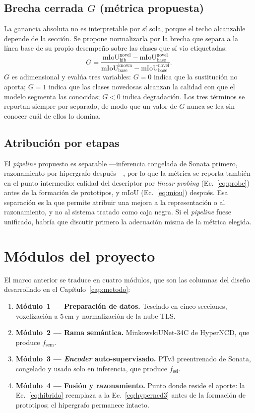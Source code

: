 \subsection{Brecha cerrada $G$ (métrica propuesta)}

La ganancia absoluta no es interpretable por sí sola, porque el techo alcanzable
depende de la sección. Se propone normalizarla por la brecha que separa a la
línea base de su propio desempeño sobre las clases que sí vio etiquetadas:
\begin{equation}
G=\frac{\mathrm{mIoU}^{\mathrm{novel}}_{\mathrm{hib}}-\mathrm{mIoU}^{\mathrm{novel}}_{\mathrm{base}}}
{\mathrm{mIoU}^{\mathrm{known}}_{\mathrm{base}}-\mathrm{mIoU}^{\mathrm{novel}}_{\mathrm{base}}}.
\label{eq:G}
\end{equation}
$G$ es adimensional y evalúa tres variables: $G=0$ indica que la sustitución no
aporta; $G=1$ indica que las clases novedosas alcanzan la calidad con que el
modelo segmenta las conocidas; $G<0$ indica degradación. Los tres términos se
reportan siempre por separado, de modo que un valor de $G$ nunca se lea sin
conocer cuál de ellos lo domina.

\subsection{Atribución por etapas}

El \emph{pipeline} propuesto es separable ---inferencia congelada de Sonata
primero, razonamiento por hipergrafo después---, por lo que la métrica se reporta
también en el punto intermedio: calidad del descriptor por \emph{linear probing}
(Ec.~\eqref{eq:probe}) antes de la formación de prototipos, y mIoU
(Ec.~\eqref{eq:miou}) después. Esa separación es la que permite atribuir una
mejora a la representación o al razonamiento, y no al sistema tratado como caja
negra. Si el \emph{pipeline} fuese unificado, habría que discutir primero la
adecuación misma de la métrica elegida.

\section{Módulos del proyecto}

El marco anterior se traduce en cuatro módulos, que son las columnas del diseño
desarrollado en el Capítulo~\ref{cap:metodo}:

\begin{enumerate}
\item \textbf{Módulo~1 --- Preparación de datos.} Teselado en cinco secciones,
voxelización a 5\,cm y normalización de la nube TLS.
\item \textbf{Módulo~2 --- Rama semántica.} MinkowskiUNet-34C de HyperNCD, que
produce $f_{\mathrm{sem}}$.
\item \textbf{Módulo~3 --- \emph{Encoder} auto-supervisado.} PTv3 preentrenado de
Sonata, congelado y usado solo en inferencia, que produce $f_{\mathrm{ssl}}$.
\item \textbf{Módulo~4 --- Fusión y razonamiento.} Punto donde reside el aporte:
la Ec.~\eqref{eq:hibrido} reemplaza a la Ec.~\eqref{eq:hyperncd3} antes de la
formación de prototipos; el hipergrafo permanece intacto.
\end{enumerate}
